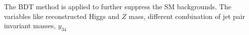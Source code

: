 %                                                                            
%     
The BDT\cite{BDT} method is applied to further suppress the SM backgrounds. The variables like 
reconstructed Higgs and $Z$ mass, different combination of jet pair invariant masses, $y_{34}$ 
